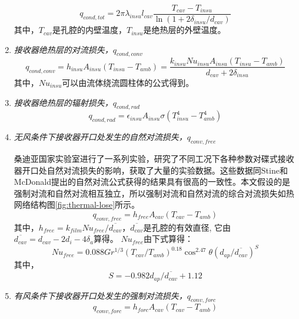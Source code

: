 \begin{enumerate}[label=(\arabic*)]
  \begin{equation}
q_{cond,tot}=2\pi\lambda_{insu}l_{cav}\dfrac{T_{cav}-T_{insu}}{\ln(1 + 2\delta_{insu}/d_{cav})}
    \end{equation}  
    其中，$T_{cav}$是孔腔的内壁温度，$T_{insu}$是绝热层的外壁温度。

  \item \emph{接收器绝热层的对流损失，$q_{cond,conv}$}  
  \begin{equation}
	q_{cond,conv}=h_{insu}A_{insu}(T_{insu}-T_{amb})
	=\dfrac{k_{insu}Nu_{insu}A_{insu}(T_{insu}-T_{amb})}{d_{cav}+2\delta_{insu}}
\end{equation}
其中，$Nu_{insu}$可以由流体绕流圆柱体的公式得到\cite{Churchill1977}。

  \item \emph{接收器绝热层的辐射损失，$q_{cond,rad}$}  
  \begin{equation}
	q_{cond,rad}=\epsilon_{insu}A_{insu}\sigma(T_{insu}^4 - T_{amb}^4)
\end{equation}
  \item \emph{无风条件下接收器开口处发生的自然对流损失，$q_{conv,free}$}
    
  桑迪亚国家实验室进行了一系列实验，研究了不同工况下各种参数对碟式接收器开口处自然对流损失的影响，获取了大量的实验数据\cite{Ma1993}。这些数据同Stine和McDonald提出的自然对流公式获得的结果具有很高的一致性。本文假设的是强制对流和自然对流相互独立，所以强制对流和自然对流的综合对流损失如热网络结构图\ref{fig:thermal-lose}所示。
  \begin{equation}
	q_{conv,free} = h_{free}A_{cav}(T_{cav}-T_{amb})
\end{equation}
其中，$h_{free}=k_{film}Nu_{free}/\overline{d_{cav}}$，$\overline{d_{cav}}$是孔腔的有效直径, 它由$\overline{d_{cav}}=d_{cav}-2d_i-4 \delta_a$算得。
$Nu_{free}由下式算得$\cite{Jilte2013b}：
\begin{equation}
	Nu_{free} = 0.088Gr^{1/3}(T_{cav}/T_{amb})^{0.18}\cos^{2.47}\theta (d_{ap}/\overline{d_{cav}})^S
\end{equation}
其中，
\begin{equation}
	S = -0.982d_{ap}/\overline{d_{cav}} + 1.12
\end{equation}

  
  \item \emph{有风条件下接收器开口处发生的强制对流损失，$q_{conv,forc}$}  
  \begin{equation}
	q_{conv,forc} = h_{forc}A_{cav}(T_{cav}-T_{amb})
\end{equation}


\end{enumerate}
